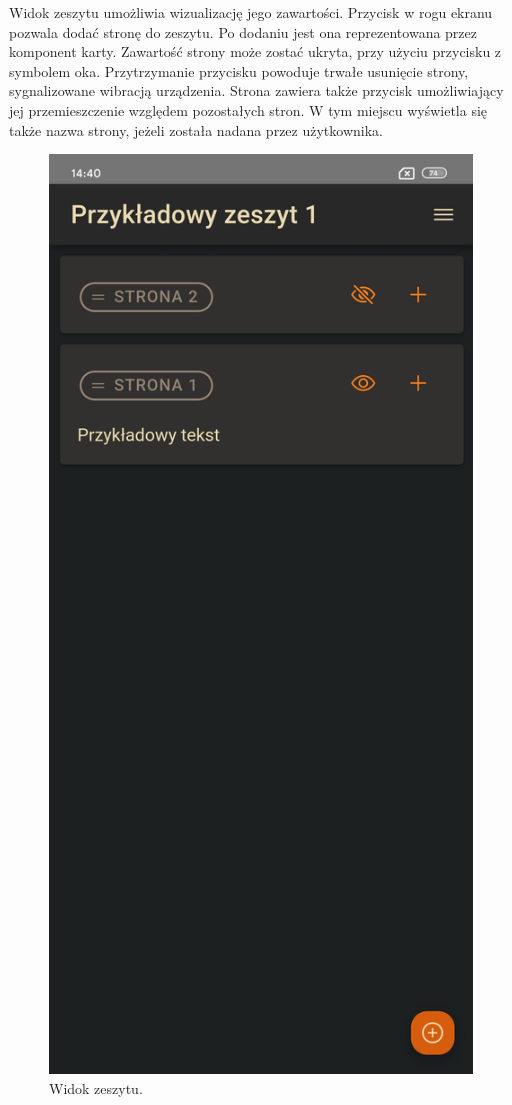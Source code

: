 Widok zeszytu umożliwia wizualizację jego zawartości. Przycisk w rogu ekranu pozwala dodać stronę do zeszytu.
Po dodaniu jest ona reprezentowana przez komponent karty. Zawartość strony może zostać ukryta,
przy użyciu przycisku z symbolem oka. Przytrzymanie przycisku powoduje trwałe usunięcie strony, sygnalizowane wibracją urządzenia.
Strona zawiera także przycisk umożliwiający jej przemieszczenie względem pozostałych stron. W tym miejscu wyświetla się także nazwa
strony, jeżeli została nadana przez użytkownika.
\begin{figure}[H]
	\begin{center}
		\includegraphics[scale=0.2]{media/BookView.jpg}
	\end{center}
	\caption{Widok zeszytu.}
	\label{rys:book-view}
\end{figure}

